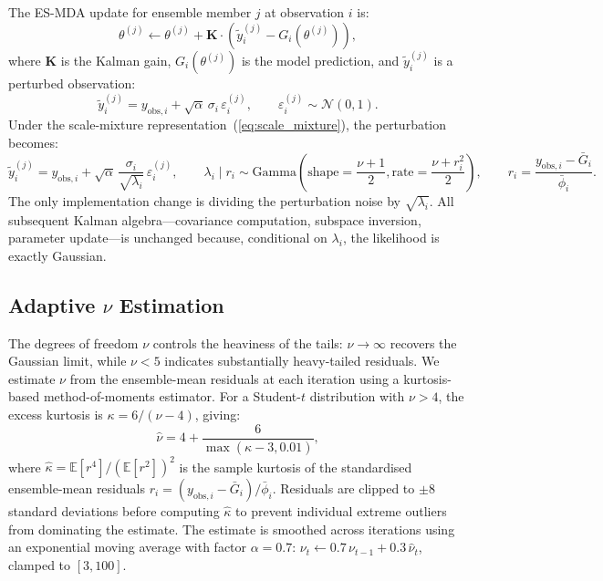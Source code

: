 \documentclass[article,nojss]{jss}
\begin{document}
The ES-MDA update for ensemble member $j$ at observation $i$ is:
\begin{equation}
\theta^{(j)} \leftarrow \theta^{(j)}
+ \mathbf{K} \cdot (\tilde{y}_i^{(j)} - G_i(\theta^{(j)})),
\end{equation}
where $\mathbf{K}$ is the Kalman gain, $G_i(\theta^{(j)})$ is the model
prediction, and $\tilde{y}_i^{(j)}$ is a perturbed observation:
\begin{equation}
\tilde{y}_i^{(j)} = y_{\text{obs},i}
+ \sqrt{\alpha}\,\sigma_i\,\varepsilon_i^{(j)},
\qquad \varepsilon_i^{(j)} \sim \mathcal{N}(0, 1).
\label{eq:perturb_gauss}
\end{equation}
Under the scale-mixture representation~(\ref{eq:scale_mixture}), the
perturbation becomes:
\begin{equation}
\tilde{y}_i^{(j)} = y_{\text{obs},i}
+ \sqrt{\alpha}\,\frac{\sigma_i}{\sqrt{\lambda_i}}\,
\varepsilon_i^{(j)},
\qquad \lambda_i \mid r_i \sim \text{Gamma}(\text{shape}=\frac{\nu+1}{2}, \text{rate}=\frac{\nu+r_i^2}{2}),
    \qquad r_i = \frac{y_{\text{obs},i} - \bar{G}_i}{\bar{\phi}_i}.
\label{eq:perturb_student}
\end{equation}
The only implementation change is dividing the perturbation noise by
$\sqrt{\lambda_i}$.
All subsequent Kalman algebra---covariance computation, subspace
inversion, parameter update---is unchanged because, conditional on
$\lambda_i$, the likelihood is exactly Gaussian.

\subsection{Adaptive $\nu$ Estimation}

The degrees of freedom $\nu$ controls the heaviness of the tails: $\nu
\to \infty$ recovers the Gaussian limit, while $\nu < 5$ indicates
substantially heavy-tailed residuals.
We estimate $\nu$ from the ensemble-mean residuals at each iteration
using a kurtosis-based method-of-moments estimator.
For a Student-$t$ distribution with $\nu > 4$, the excess kurtosis is
$\kappa = 6/(\nu - 4)$, giving:
\begin{equation}
\hat{\nu} = 4 + \frac{6}{\max(\hat{\kappa} - 3, 0.01)},
\label{eq:nu_est}
\end{equation}
where $\hat{\kappa} = \mathbb{E}[r^4] / (\mathbb{E}[r^2])^2$ is the
sample kurtosis of the standardised ensemble-mean residuals
$r_i = (y_{\text{obs},i} - \bar{G}_i) / \bar{\phi}_i$.
Residuals are clipped to $\pm 8$ standard deviations before computing
$\hat{\kappa}$ to prevent individual extreme outliers from dominating
the estimate.
The estimate is smoothed across iterations using an exponential moving
average with factor $\alpha = 0.7$:
$\nu_t \leftarrow 0.7\,\nu_{t-1} + 0.3\,\hat{\nu}_t$, clamped to
$[3, 100]$.
\end{document}
